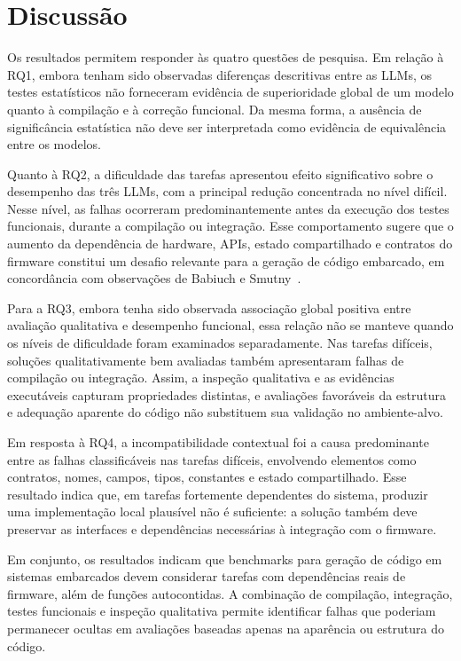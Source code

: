 \documentclass[12pt]{article}
\begin{document}
\section{Discussão}
\label{sec:discussao}

Os resultados permitem responder às quatro questões de pesquisa. Em relação à RQ1, embora tenham sido observadas diferenças descritivas entre as LLMs, os testes estatísticos não forneceram evidência de superioridade global de um modelo quanto à compilação e à correção funcional. Da mesma forma, a ausência de significância estatística não deve ser interpretada como evidência de equivalência entre os modelos.

Quanto à RQ2, a dificuldade das tarefas apresentou efeito significativo sobre o desempenho das três LLMs, com a principal redução concentrada no nível difícil. Nesse nível, as falhas ocorreram predominantemente antes da execução dos testes funcionais, durante a compilação ou integração. Esse comportamento sugere que o aumento da dependência de hardware, APIs, estado compartilhado e contratos do firmware constitui um desafio relevante para a geração de código embarcado, em concordância com observações de Babiuch e Smutny~\cite{babiuch2026benchmarking}.

Para a RQ3, embora tenha sido observada associação global positiva entre avaliação qualitativa e desempenho funcional, essa relação não se manteve quando os níveis de dificuldade foram examinados separadamente. Nas tarefas difíceis, soluções qualitativamente bem avaliadas também apresentaram falhas de compilação ou integração. Assim, a inspeção qualitativa e as evidências executáveis capturam propriedades distintas, e avaliações favoráveis da estrutura e adequação aparente do código não substituem sua validação no ambiente-alvo.

Em resposta à RQ4, a incompatibilidade contextual foi a causa predominante entre as falhas classificáveis nas tarefas difíceis, envolvendo elementos como contratos, nomes, campos, tipos, constantes e estado compartilhado. Esse resultado indica que, em tarefas fortemente dependentes do sistema, produzir uma implementação local plausível não é suficiente: a solução também deve preservar as interfaces e dependências necessárias à integração com o firmware.

Em conjunto, os resultados indicam que benchmarks para geração de código em sistemas embarcados devem considerar tarefas com dependências reais de firmware, além de funções autocontidas. A combinação de compilação, integração, testes funcionais e inspeção qualitativa permite identificar falhas que poderiam permanecer ocultas em avaliações baseadas apenas na aparência ou estrutura do código.
\end{document}
